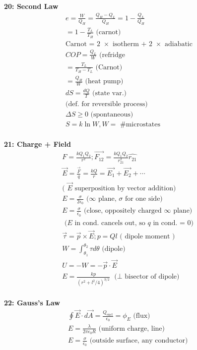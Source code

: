 \documentclass[twoside,draft]{article}
\begin{document}
\begin{multicols}{3}
  \textbf{20: Second Law}
  \begin{align*}
    e = \frac{W}{Q_H} = \frac{Q_H - Q_L}{Q_H} = 1 - \frac{Q_L}{Q_H} \\
    = 1 - \frac{T_L}{T_H} \text{ (carnot)} \\
    \text{Carnot = 2 $\times$ isotherm + 2 $\times$ adiabatic} \\
    COP = \frac{Q_L}{W} \text{ (refridge} \\
    = \frac{T_L}{T_H - T_L} \text{ (Carnot)} \\
    = \frac{Q_H}{W} \text{ (heat pump)} \\
    dS = \frac{dQ}{T} \text{ (state var.)} \\
    \text{(def. for reversible process)} \\
    \Delta S \geq 0 \text{ (spontaneous)} \\
    S = k \ln W, W = \text{ \# microstates} \\
  \end{align*}
  
  \textbf{21: Charge + Field}
  \begin{align*}
    F = \frac{kQ_1Q_2}{r^2};
    \vec{F_{12}} = \frac{kQ_1Q_2}{r^2_{21}} \hat{r_{21}} \\
    \vec{E} = \frac{\vec{F}}{q} = \frac{kQ}{r}
    = \vec{E_1} + \vec{E_2} + \cdots \\
    \text{( $\vec{E}$ superposition by vector addition)} \\
    E = \frac{\sigma}{2\epsilon_0} \text{ ($\infty$ plane,
      $\sigma$ for one side)} \\
    E = \frac{\sigma}{\epsilon_0} \text{ (close, oppositely
      charged $\infty$ plane)} \\
    \text{ ($E$ in cond. cancels out, so $q$ in cond. = 0) } \\
    \vec{\tau} = \vec{p} \times \vec{E};
    p = Ql \text{ ( dipole moment ) } \\
    W = \int_{\theta_1}^{\theta_2} \tau d\theta \text{ (dipole) } \\
    U = -W = -\vec{p} \cdot \vec{E} \\
    E = \frac{kp}{(r^2+l^2/4)^{3/2}} \text{ ($\perp$ bisector of dipole) } \\
  \end{align*}
  
  \textbf{22: Gauss's Law}
  \begin{align*}
    \oint \vec{E} \cdot d\vec{A} = \frac{Q_{\text{encl}}}{\epsilon_0} =
    \phi_E \text{ (flux) } \\
    E = \frac{\lambda}{2\pi\epsilon_0R} \text{ (uniform charge, line) } \\
    E = \frac{\sigma}{\epsilon_0} \text{ (outside surface, any conductor) }
  \end{align*}
  

\end{multicols}
\end{document}

